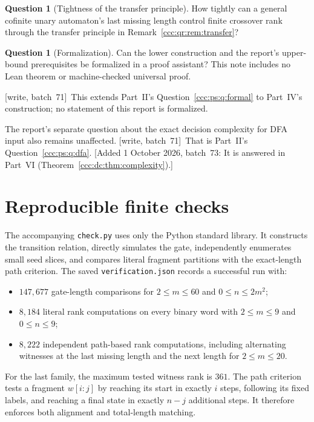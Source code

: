 \documentclass[11pt,letterpaper]{article}
\theoremstyle{definition}
\newtheorem{question}[theorem]{Question}
\theoremstyle{remark}
\newcommand{\wsevone}{\textup{[write, batch~71]}}
\newcommand{\waddsevthree}[1]{\textup{[}Added 1 October 2026, batch~73: #1\textup{]}}
\begin{document}
\begin{question}[Tightness of the transfer principle]\label{ccc:qr:q:transfer}
How tightly can a general cofinite unary automaton's last missing length
control finite crossover rank through the transfer principle in
Remark~\ref{ccc:qr:rem:transfer}?
\end{question}

\begin{question}[Formalization]\label{ccc:qr:q:formal}
Can the lower construction and the report's upper-bound prerequisites be
formalized in a proof assistant? This note includes no Lean theorem or
machine-checked universal proof.
\end{question}
\wsevone\ This extends Part~II's Question~\ref{ccc:ps:q:formal} to Part~IV's
construction; no statement of this report is formalized.

The report's separate question about the exact decision complexity for DFA
input also remains unaffected.
\wsevone\ That is Part~II's Question~\ref{ccc:ps:q:dfa}.
\waddsevthree{It is answered in Part~VI (Theorem~\ref{ccc:dc:thm:complexity}).}

\section{Reproducible finite checks}\label{ccc:qr:sec:checks}

The accompanying \texttt{check.py} uses only the Python standard library. It
constructs the transition relation, directly simulates the gate,
independently enumerates small seed slices, and compares literal fragment
partitions with the exact-length path criterion. The saved
\texttt{verification.json} records a successful run with:
\begin{itemize}
\item $147{,}677$ gate-length comparisons for $2\le m\le60$ and $0\le n\le2m^2$;
\item $8{,}184$ literal rank computations on every binary word with $2\le m\le9$ and $0\le n\le9$;
\item $8{,}222$ independent path-based rank computations, including alternating witnesses at the last missing length and the next length for $2\le m\le20$.
\end{itemize}
For the last family, the maximum tested witness rank is $361$. The path
criterion tests a fragment $w[i:j]$ by reaching its start in exactly $i$
steps, following its fixed labels, and reaching a final state in exactly
$n-j$ additional steps. It therefore enforces both alignment and total-length
matching.
\end{document}
